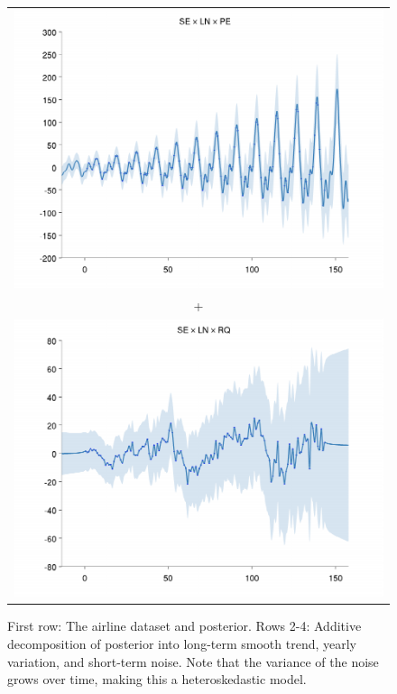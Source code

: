 \documentclass[twoside]{article}
\begin{document}
\begin{figure}[h!]
\begin{tabular}{c}
 \includegraphics[width=\wagd,height=\hagd]{../figures/decomposition/01-airline-months_max_level_8/01-airline-months_2} \\
 + \\
 \includegraphics[width=\wagd,height=\hagd]{../figures/decomposition/01-airline-months_max_level_8/01-airline-months_3}
\end{tabular}
\caption{First row:  The airline dataset and posterior.  Rows 2-4: Additive decomposition of posterior into long-term smooth trend, yearly variation, and short-term noise.  Note that the variance of the noise grows over time, making this a heteroskedastic model.}
\label{fig:airline_decomp}
\end{figure}
\end{document}
